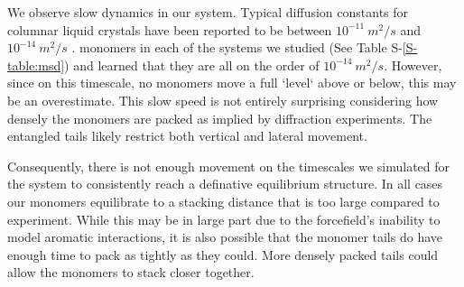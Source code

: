 \documentclass[journal=jpcbfk,manuscript=article]{achemso}
\begin{document}
  We observe slow dynamics in our system. Typical diffusion constants for columnar
  liquid crystals have been reported to be between $10^{-11}~ m^2/s$ 
  \cite{dong_translational_1984} and $10^{-14}~m^2/s$ \cite{dvinskikh_molecular_2002}. 
  monomers in each of the systems we studied (See Table
  S-\ref{S-table:msd}) and learned that they are all on the order of
  $10^{-14}~m^2/s$. However, since on this timescale, no monomers move
  a full `level` above or below, this may be an overestimate.  This slow speed is
  not entirely surprising considering how densely the monomers are
  packed as implied by diffraction experiments. The entangled tails
  likely restrict both vertical and lateral movement.
  


  Consequently, there is not enough movement on the timescales we simulated for the system to 
  consistently reach a definative equilibrium structure.
  In all cases our monomers
  equilibrate to a stacking distance that is too large compared to experiment. 
  While this may be in large part due to the forcefield's inability to model aromatic
  interactions, it is also possible that the monomer tails do have enough time to pack 
  as tightly as they could. More densely packed tails could allow the monomers to stack
  closer together. 
  
\end{document}
